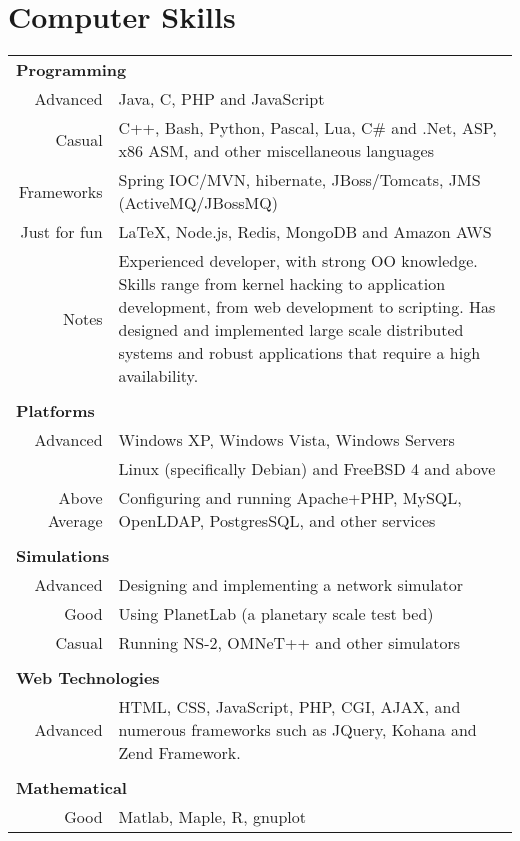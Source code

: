 \documentclass[a4paper,10pt]{article}
\begin{document}
\section{Computer Skills}
\begin{tabular}{r|p{12cm}}

\multicolumn{2}{l}{\textbf{Programming}} \\
Advanced      & Java, C, PHP and JavaScript \\
Casual        & C++, Bash, Python, Pascal, Lua, C\# and .Net, ASP, x86 ASM, and other miscellaneous languages \\
Frameworks    & Spring IOC/MVN, hibernate, JBoss/Tomcats, JMS (ActiveMQ/JBossMQ) \\
Just for fun  & \LaTeX, Node.js, Redis, MongoDB and Amazon AWS \\
Notes         & Experienced developer, with strong OO knowledge. Skills range from kernel hacking to application
                development, from web development to scripting. Has designed and implemented large scale distributed
                systems and robust applications that require a high availability.\\


\multicolumn{2}{l}{} \\
\multicolumn{2}{l}{\textbf{Platforms}} \\
Advanced       & Windows XP, Windows Vista, Windows Servers\\
               & Linux (specifically Debian) and FreeBSD 4 and above\\
Above Average  & Configuring and running Apache+PHP, MySQL, OpenLDAP, PostgresSQL, and other services\\

\multicolumn{2}{l}{} \\
\multicolumn{2}{l}{\textbf{Simulations}} \\
Advanced & Designing and implementing a network simulator\\
Good     & Using PlanetLab (a planetary scale test bed)\\
Casual   & Running NS-2, OMNeT++ and other simulators\\

\multicolumn{2}{l}{} \\
\multicolumn{2}{l}{\textbf{Web Technologies}} \\
Advanced & HTML, CSS, JavaScript, PHP, CGI, AJAX, and numerous frameworks such as JQuery, Kohana and Zend Framework.\\

\multicolumn{2}{l}{} \\
\multicolumn{2}{l}{\textbf{Mathematical}} \\
Good & Matlab, Maple, R, gnuplot\\

\end{tabular}
\end{document}
